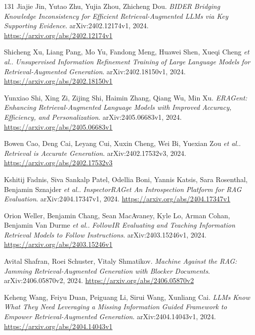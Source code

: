 \documentclass[11pt,a4paper]{article}
\begin{document}
\begin{thebibliography}{131}
Jiajie Jin, Yutao Zhu, Yujia Zhou, Zhicheng Dou.
\newblock \emph{BIDER Bridging Knowledge Inconsistency for Efficient Retrieval-Augmented LLMs via Key Supporting Evidence}.
\newblock arXiv:2402.12174v1, 2024.
\newblock \url{https://arxiv.org/abs/2402.12174v1}

Shicheng Xu, Liang Pang, Mo Yu, Fandong Meng, Huawei Shen, Xueqi Cheng \emph{et al.}.
\newblock \emph{Unsupervised Information Refinement Training of Large Language Models for Retrieval-Augmented Generation}.
\newblock arXiv:2402.18150v1, 2024.
\newblock \url{https://arxiv.org/abs/2402.18150v1}

Yunxiao Shi, Xing Zi, Zijing Shi, Haimin Zhang, Qiang Wu, Min Xu.
\newblock \emph{ERAGent: Enhancing Retrieval-Augmented Language Models with Improved Accuracy, Efficiency, and Personalization}.
\newblock arXiv:2405.06683v1, 2024.
\newblock \url{https://arxiv.org/abs/2405.06683v1}

Bowen Cao, Deng Cai, Leyang Cui, Xuxin Cheng, Wei Bi, Yuexian Zou \emph{et al.}.
\newblock \emph{Retrieval is Accurate Generation}.
\newblock arXiv:2402.17532v3, 2024.
\newblock \url{https://arxiv.org/abs/2402.17532v3}

Kshitij Fadnis, Siva Sankalp Patel, Odellia Boni, Yannis Katsis, Sara Rosenthal, Benjamin Sznajder \emph{et al.}.
\newblock \emph{InspectorRAGet An Introspection Platform for RAG Evaluation}.
\newblock arXiv:2404.17347v1, 2024.
\newblock \url{https://arxiv.org/abs/2404.17347v1}

Orion Weller, Benjamin Chang, Sean MacAvaney, Kyle Lo, Arman Cohan, Benjamin Van Durme \emph{et al.}.
\newblock \emph{FollowIR Evaluating and Teaching Information Retrieval Models to Follow Instructions}.
\newblock arXiv:2403.15246v1, 2024.
\newblock \url{https://arxiv.org/abs/2403.15246v1}

Avital Shafran, Roei Schuster, Vitaly Shmatikov.
\newblock \emph{Machine Against the RAG: Jamming Retrieval-Augmented Generation with Blocker Documents}.
\newblock arXiv:2406.05870v2, 2024.
\newblock \url{https://arxiv.org/abs/2406.05870v2}

Keheng Wang, Feiyu Duan, Peiguang Li, Sirui Wang, Xunliang Cai.
\newblock \emph{LLMs Know What They Need Leveraging a Missing Information Guided Framework to Empower Retrieval-Augmented Generation}.
\newblock arXiv:2404.14043v1, 2024.
\newblock \url{https://arxiv.org/abs/2404.14043v1}


\end{thebibliography}
\end{document}

